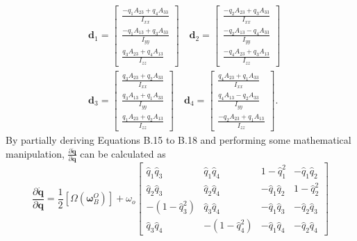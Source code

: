 $$
\begin{aligned}
& \mathbf{d}_{1}=\left[\begin{array}{c}\frac{-q_{1} A_{23}+q_{4} A_{33}}{I_{x x}} \\\frac{-q_{1} A_{13}+q_{3} A_{33}}{I_{y y}} \\\frac{q_{3} A_{23}+q_{4} A_{13}}{I_{z z}}\end{array}\right] \quad \mathbf{d}_{2}=\left[\begin{array}{l}\frac{-q_{2} A_{23}+q_{3} A_{33}}{I_{x x}} \\\frac{-q_{2} A_{13}-q_{4} A_{33}}{I_{y y}} \\\frac{-q_{4} A_{23}+q_{3} A_{13}}{I_{z z}}\end{array}\right] \\
& \mathbf{d}_{3}=\left[\begin{array}{c}\frac{q_{3} A_{23}+q_{2} A_{33}}{I_{x x}} \\\frac{q_{3} A_{13}+q_{1} A_{33}}{I_{y y}} \\\frac{q_{1} A_{23}+q_{2} A_{13}}{I_{z z}}\end{array}\right] \quad \mathbf{d}_{4}=\left[\begin{array}{c}\frac{q_{4} A_{23}+q_{1} A_{33}}{I_{x x}} \\\frac{q_{4} A_{13}-q_{2} A_{33}}{I_{y y}} \\\frac{-q_{2} A_{23}+q_{1} A_{13}}{I_{z z}}\end{array}\right] . 
\end{aligned}
$$
By partially deriving Equations B.15 to B.18 and performing some mathematical manipulation, $\frac{\partial \dot{\mathbf{q}}}{\partial \mathbf{q}}$ can be calculated as
$$
\frac{\partial \dot{\mathbf{q}}}{\partial \mathbf{q}}=\frac{1}{2}\left[\Omega\left(\boldsymbol{\omega}_{B}^{O}\right)\right]+\omega_{o}\left[\begin{array}{cccc}
\hat{q}_{1} \hat{q}_{3} & \hat{q}_{1} \hat{q}_{4} & 1-\hat{q}_{1}^{2} & -\hat{q}_{1} \hat{q}_{2} \\
\hat{q}_{2} \hat{q}_{3} & \hat{q}_{2} \hat{q}_{4} & -\hat{q}_{1} \hat{q}_{2} & 1-\hat{q}_{2}^{2} \\
-\left(1-\hat{q}_{3}^{2}\right) & \hat{q}_{3} \hat{q}_{4} & -\hat{q}_{1} \hat{q}_{3} & -\hat{q}_{2} \hat{q}_{3} \\
\hat{q}_{3} \hat{q}_{4} & -\left(1-\hat{q}_{4}^{2}\right) & -\hat{q}_{1} \hat{q}_{4} & -\hat{q}_{2} \hat{q}_{4}
\end{array}\right]
$$